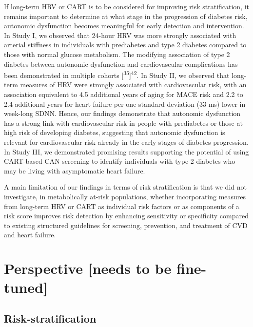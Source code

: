 \documentclass[
  a4paper,
  headsepline=true,
  open=any]{scrbook}
\begin{document}
If long-term HRV or CART is to be considered for improving risk
stratification, it remains important to determine at what stage in the
progression of diabetes risk, autonomic dysfunction becomes meaningful
for early detection and intervention. In Study I, we observed that
24-hour HRV was more strongly associated with arterial stiffness in
individuals with prediabetes and type 2 diabetes compared to those with
normal glucose metabolism. The modifying association of type 2 diabetes
between autonomic dysfunction and cardiovascular complications has been
demonstrated in multiple cohorts
{[}\textsuperscript{35}{]}\textsuperscript{42}. In Study II, we observed
that long-term measures of HRV were strongly associated with
cardiovascular risk, with an association equivalent to 4.5 additional
years of aging for MACE risk and 2.2 to 2.4 additional years for heart
failure per one standard deviation (33 ms) lower in week-long SDNN.
Hence, our findings demonstrate that autonomic dysfunction has a strong
link with cardiovascular risk in people with prediabetes or those at
high risk of developing diabetes, suggesting that autonomic dysfunction
is relevant for cardiovascular risk already in the early stages of
diabetes progression. In Study III, we demonstrated promising results
supporting the potential of using CART-based CAN screening to identify
individuals with type 2 diabetes who may be living with asymptomatic
heart failure.

A main limitation of our findings in terms of risk stratification is
that we did not investigate, in metabolically at-risk populations,
whether incorporating measures from long-term HRV or CART as individual
risk factors or as components of a risk score improves risk detection by
enhancing sensitivity or specificity compared to existing structured
guidelines for screening, prevention, and treatment of CVD and heart
failure.


\hypertarget{perspective-needs-to-be-fine-tuned}{%
\chapter{Perspective {[}needs to be
fine-tuned{]}}\label{perspective-needs-to-be-fine-tuned}}

\hypertarget{risk-stratification-2}{%
\section{Risk-stratification}\label{risk-stratification-2}}
\end{document}
